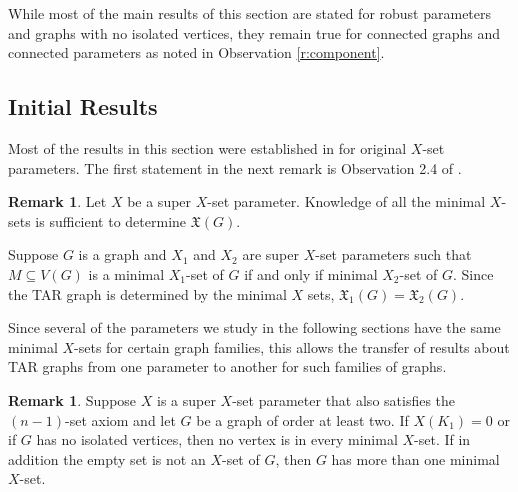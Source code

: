 \documentclass{article}
\numberwithin{figure}{section}
\numberwithin{table}{section}
\numberwithin{equation}{section}
\theoremstyle{definition}
\newtheorem{rem}[thm]{Remark}
\theoremstyle{definition}
\theoremstyle{definition}
\newcommand{\Xb}{X}
\newcommand{\xtar}{\mathfrak{X}}%
\begin{document}
{%
While most of the main results of this section are stated for robust parameters and graphs with no isolated vertices, they remain true for connected graphs and connected parameters as noted in Observation \ref{r:component}.



\subsection{Initial Results}

Most of the results in this section  were  established in \cite{PDrecon} for original $X$-set parameters.   
The first statement in the next remark is  Observation 2.4 of \cite{PDrecon}.



\begin{rem}\label{r:sameXsets}     Let $\Xb$ be a super $X$-set parameter.  Knowledge of all the minimal $X$-sets is sufficient to determine $\xtar(G)$.

Suppose $G$ is a graph and $X_1$ and $X_2$ are super $X$-set parameters   such that $M\subseteq V(G)$ is a minimal $X_1$-set of $G$ if and only if minimal $X_2$-set of $G$.  Since the TAR graph is determined by the minimal $X$ sets, $\xtar_1(G)=\xtar_2(G)$.
\end{rem}




 Since several of the parameters we study in the following sections have the same minimal $X$-sets for certain graph families, this allows the transfer of results about TAR graphs from one parameter to another for such families of graphs.


  \begin{rem}\label{r:minXsets}
         Suppose $\Xb$ is  a super $X$-set parameter that also satisfies the $(n-1)$-set axiom and let $G$ be a graph of order at least two.  If $X(K_1)=0$ or if $G$ has no isolated vertices, then no vertex is in every minimal $\Xb$-set. If in addition the empty set is not an 
    $\Xb$-set of $G$, then $G$ has more than one minimal $\Xb$-set. 
 \end{rem}



}
\end{document}
